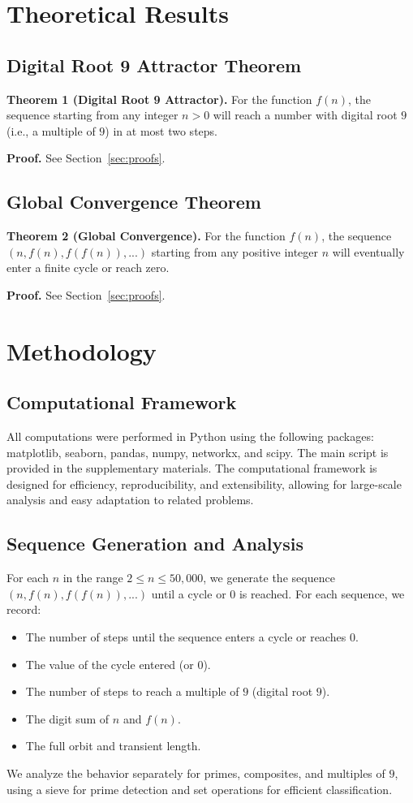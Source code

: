 \documentclass[12pt]{article}
\begin{document}
\section{Theoretical Results}
\subsection{Digital Root 9 Attractor Theorem}
\textbf{Theorem 1 (Digital Root 9 Attractor).} For the function $f(n)$, the sequence starting from any integer $n > 0$ will reach a number with digital root $9$ (i.e., a multiple of $9$) in at most two steps.

\textbf{Proof.} See Section~\ref{sec:proofs}.

\subsection{Global Convergence Theorem}
\textbf{Theorem 2 (Global Convergence).} For the function $f(n)$, the sequence $(n, f(n), f(f(n)), ...)$ starting from any positive integer $n$ will eventually enter a finite cycle or reach zero.

\textbf{Proof.} See Section~\ref{sec:proofs}.


\section{Methodology}
\subsection{Computational Framework}
All computations were performed in Python using the following packages: matplotlib, seaborn, pandas, numpy, networkx, and scipy. The main script is provided in the supplementary materials. The computational framework is designed for efficiency, reproducibility, and extensibility, allowing for large-scale analysis and easy adaptation to related problems.

\subsection{Sequence Generation and Analysis}
For each $n$ in the range $2 \leq n \leq 50,000$, we generate the sequence $(n, f(n), f(f(n)), ...)$ until a cycle or $0$ is reached. For each sequence, we record:
\begin{itemize}
    \item The number of steps until the sequence enters a cycle or reaches $0$.
    \item The value of the cycle entered (or $0$).
    \item The number of steps to reach a multiple of $9$ (digital root $9$).
    \item The digit sum of $n$ and $f(n)$.
    \item The full orbit and transient length.
\end{itemize}
We analyze the behavior separately for primes, composites, and multiples of $9$, using a sieve for prime detection and set operations for efficient classification.
\end{document}
